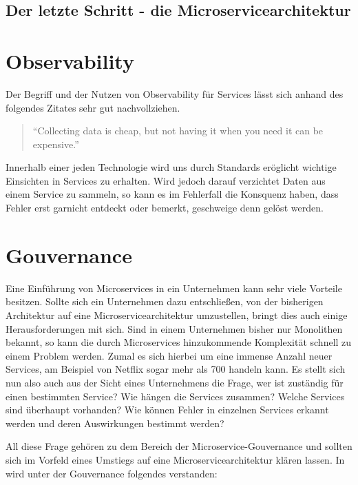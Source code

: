 \subsection{Der letzte Schritt - die Microservicearchitektur}

\section{Observability}

Der Begriff und der Nutzen von Observability für Services lässt sich anhand des folgendes Zitates sehr gut nachvollziehen.

\begin{quote}
	\enquote{Collecting data is cheap, but not having it when you need it can be expensive.}\autocite[S. 373]{microservice_enterprise}
\end{quote}

Innerhalb einer jeden Technologie wird uns durch Standards  eröglicht wichtige Einsichten in Services zu erhalten. Wird jedoch darauf verzichtet Daten aus einem Service zu sammeln, so kann es im Fehlerfall die Konsquenz haben, dass Fehler erst garnicht entdeckt oder bemerkt, geschweige denn gelöst werden.

\section{Gouvernance}

Eine Einführung von Microservices in ein Unternehmen kann sehr viele Vorteile besitzen. Sollte sich ein Unternehmen dazu entschließen, von der bisherigen Architektur auf eine Microservicearchitektur umzustellen, bringt dies auch einige Herausforderungen mit sich. Sind in einem Unternehmen bisher nur Monolithen bekannt, so kann die durch Microservices hinzukommende Komplexität schnell zu einem Problem werden. Zumal es sich hierbei um eine immense Anzahl neuer Services, am Beispiel von Netflix sogar mehr als 700 handeln kann. Es stellt sich nun also auch aus der Sicht eines Unternehmens die Frage, wer ist zuständig für einen bestimmten Service? Wie hängen die Services zusammen? Welche Services sind überhaupt vorhanden? Wie können Fehler in einzelnen Services erkannt werden und deren Auswirkungen bestimmt werden?

All diese Frage gehören zu dem Bereich der Microservice-Gouvernance und sollten sich im Vorfeld eines Umstiegs auf eine Microservicearchitektur klären lassen. In  wird unter der Gouvernance folgendes verstanden:

